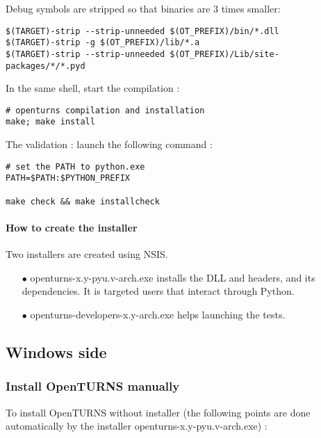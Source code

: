 Debug symbols are stripped so that binaries are 3 times smaller:
\begin{verbatim}
$(TARGET)-strip --strip-unneeded $(OT_PREFIX)/bin/*.dll
$(TARGET)-strip -g $(OT_PREFIX)/lib/*.a
$(TARGET)-strip --strip-unneeded $(OT_PREFIX)/Lib/site-packages/*/*.pyd
\end{verbatim}

In the same shell, start the compilation :
\begin{verbatim}
# openturns compilation and installation
make; make install
\end{verbatim}

The validation : launch the following command :
\begin{verbatim}
# set the PATH to python.exe
PATH=$PATH:$PYTHON_PREFIX

make check && make installcheck
\end{verbatim}

\paragraph{How to create the installer}

Two installers are created using NSIS.
\begin{itemize}
\item[$\bullet$]   openturns-x.y-pyu.v-arch.exe installs the DLL and headers, and its dependencies. It is targeted users that interact through Python.
\item[$\bullet$]   openturns-developers-x.y-arch.exe helps launching the tests.
\end{itemize}

\subsection{Windows side}

\subsubsection{Install OpenTURNS manually}

To install OpenTURNS without installer (the following points are done automatically by the installer openturns-x.y-pyu.v-arch.exe) :

